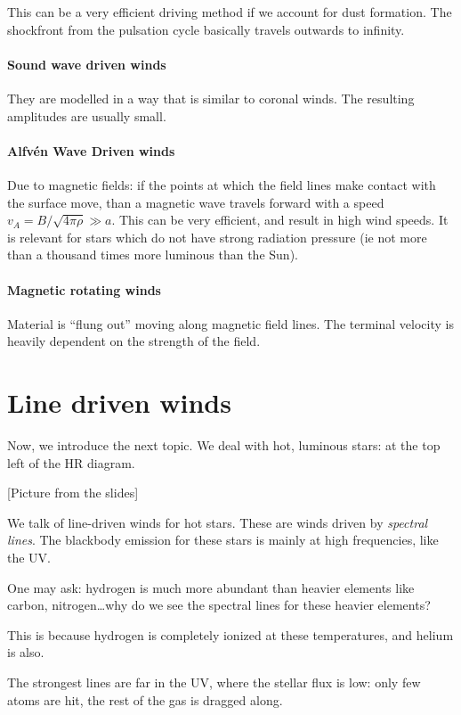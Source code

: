 \documentclass[main.tex]{subfiles}
\begin{document}
This can be a very efficient driving method if we account for dust formation. The shockfront from the pulsation cycle basically travels outwards to infinity.

\paragraph{Sound wave driven winds}
They are modelled in a way that is similar to coronal winds. 
The resulting amplitudes are usually small. 

\paragraph{Alfvén Wave Driven winds}
Due to magnetic fields: if the points at which the field lines make contact with the surface move, than a magnetic wave travels forward with a speed \(v_A = B / \sqrt{4 \pi \rho } \gg a\). 
This can be very efficient, and result in high wind speeds. 
It is relevant for stars which do not have strong radiation pressure (ie not more than a thousand times more luminous than the Sun). 

\paragraph{Magnetic rotating winds}
Material is ``flung out'' moving along magnetic field lines. 
The terminal velocity is heavily dependent on the strength of the field.

\section{Line driven winds}

Now, we introduce the next topic.
We deal with hot, luminous stars: at the top left of the HR diagram.

[Picture from the slides]

We talk of line-driven winds for hot stars.
These are winds driven by \emph{spectral lines}. 
The blackbody emission for these stars is mainly at high frequencies, like the UV.

One may ask: hydrogen is much more abundant than heavier elements like carbon, nitrogen\dots why do we see the spectral lines for these heavier elements?

This is because hydrogen is completely ionized at these temperatures, and helium is also.

The strongest lines are far in the UV, where the stellar flux is low: only few atoms are hit, the rest of the gas is dragged along.
\end{document}
